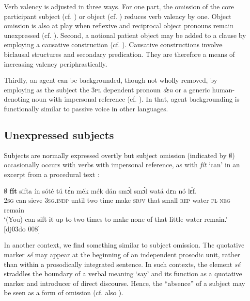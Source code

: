 Verb valency is adjusted in three ways. For one part, the omission of the core participant subject (cf. ) or object (cf. ) reduces verb valency by one. Object omission is also at play when reflexive and reciprocal object pronouns remain unexpressed (cf. ). Second, a notional patient object may be added to a clause by employing a causative construction (cf. ). Causative constructions involve biclausal structures and secondary predication. They are therefore a means of increasing valency periphrastically.


Thirdly, an agent can be backgrounded, though not wholly removed, by employing as the subject the \textsc{3pl} dependent pronoun \textit{dɛn} or a generic human-denoting noun with impersonal reference (cf. ). In that, agent backgrounding is functionally similar to passive voice in other languages. 


\subsection{Unexpressed subjects}\label{sec:9.4.1}

Subjects are normally expressed overtly but subject omission (indicated by ${\emptyset}$) occasionally occurs with verbs with impersonal reference, as with \textit{fít} ‘can’ in an excerpt from a procedural text : 


\ea%
    \label{ex:key:1270}
    \gll \textbf{${\emptyset}$}  \textbf{fít}  sifta    ín    sóté    tú  tɛ́n    mék    mék
dán  smɔ́l  smɔ́l  watá  dɛn  nó  lɛ́f.\\
\textsc{2sg}  can  sieve  \textsc{3sg.indp}  until  two  time    make  \textsc{sbjv}
that  small  \textsc{rep}    water  \textsc{pl}  \textsc{neg}  remain\\

\glt ‘(You) can sift it up to two times to make none of that little water remain.’ [dj03do 008]
\z

In another context, we find something similar to subject omission. The quotative marker \textit{sé} may appear at the beginning of an independent prosodic unit, rather than within a prosodically integrated sentence. In such contexts, the element \textit{sé} straddles the boundary of a verbal meaning ‘say’ and its function as a quotative marker and introducer of direct discourse. Hence, the “absence” of a subject may be seen as a form of omission (cf. also ).


